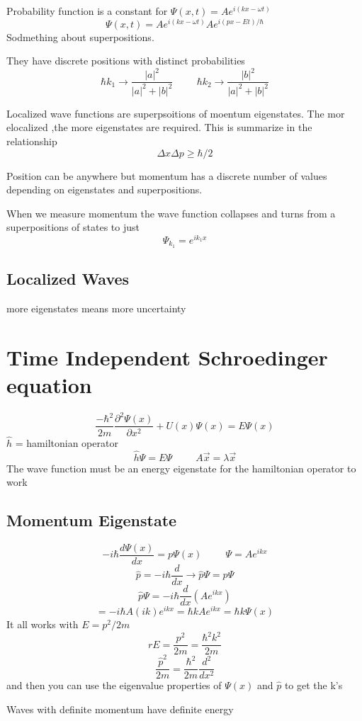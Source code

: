 \documentclass[fleqn]{report}
\newcommand{\hp}{\hspace{1cm}}
\newcommand{\del}{\partial}
\begin{document}
Probability function is a constant for $\Psi (x, t) = Ae^{i(kx - \omega t)}$
\[
\Psi (x, t) = Ae^{i(kx - \omega t)} Ae^{i(px - E t)/ \hbar}
\]
Sodmething about superpositions.

They have discrete positions with distinct probabilities
\[
\hbar k_1 \rightarrow \frac{|a|^2}{|a|^2 + |b|^2}
\hp
\hbar k_2 \rightarrow \frac{|b|^2}{|a|^2 + |b|^2}
\]

Localized wave functions are superpsoitions of moentum eigenstates. The mor elocalized ,the more eigenstates are required. This is summarize in the relationship 
\[
\Delta x \Delta p \geq \hbar / 2 
\]

Position can be anywhere but momentum has a discrete number of values depending on eigenstates and superpositions.

When we measure momentum the wave function collapses and turns from a superpositions of states to just
\[
\Psi_{k_1} = e^{ik_1x}
\]

\section{Localized Waves}
more eigenstates means more uncertainty


\chapter{Time Independent Schroedinger equation}
\[
\frac{- \hbar^2}{2m} \frac{\del^2 \Psi (x)}{\del x^2}
+
U(x) \Psi (x)
=
E \Psi (x)
\]
$\hat{h}$ = hamiltonian operator
\[
\hat{h} \Psi = E \Psi
\hp
A \vec{x} = \lambda \vec{x}
\]
The wave function must be an energy eigenstate for the hamiltonian operator to work

\section{Momentum Eigenstate}
\[
-i \hbar \frac{d \Psi(x)}{dx} = p \Psi(x)
\hp
\Psi = Ae^{ikx}
\]
\[
\hat{p} = -i \hbar \frac{d}{dx}
\longrightarrow
\hat{p} \Psi = p \Psi
\]
\[
\hat{p} \Psi 
=
 -i \hbar \frac{d}{dx}
\left(
Ae^{ikx}
\right)
\]
\[
=
-i \hbar A (ik) e^{ikx}
=
\hbar k A e^{ikx}
=
\hbar k \Psi(x)
\]
It all works with $E = p^2 / 2m$
\[r
E = \frac{p^2}{2m} = \frac{\hbar^2 k^2}{2m}
\]
\[
\frac{\hat{p}^2}{2m} = \frac{\hbar^2}{2m} \frac{d^2}{dx^2}
\]
and then you can use the eigenvalue properties of $\Psi(x)$ and $\hat{p}$ to get the k's

Waves with definite momentum have definite energy
\end{document}

